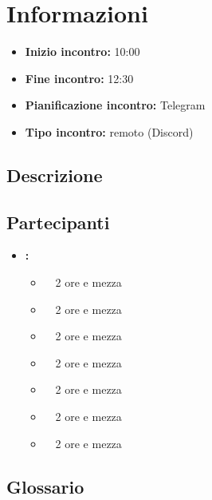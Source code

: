 \section{Informazioni}
\begin{itemize}
	\item \textbf{Inizio incontro:} 10:00
	\item \textbf{Fine incontro:} 12:30
	\item \textbf{Pianificazione incontro:} Telegram
	\item \textbf{Tipo incontro:} remoto (Discord)
\end{itemize}

\subsection{Descrizione}
\DocDescription

\subsection{Partecipanti}

\begin{itemize}
	\item \textbf{\GroupName:}
	\begin{itemize}
		\item \tommaso \ \rightarrow\ 2 ore e mezza
		\item \marco \ \rightarrow\ 2 ore e mezza
		\item \raul \ \rightarrow\ 2 ore e mezza
		\item \sebastiano \ \rightarrow\ 2 ore e mezza
		\item \martina \ \rightarrow\ 2 ore e mezza
		\item \riccardo \ \rightarrow\ 2 ore e mezza
		\item \mattia \ \rightarrow\  2 ore e mezza
	\end{itemize}
\end{itemize}

\subsection{Glossario}
\GlossarioIntroduzione

\clearpage